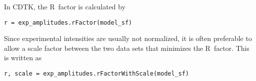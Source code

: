 \documentclass[12pt]{article}
\begin{document}
\begin{sloppy}
In CDTK, the R~factor is calculated by
\begin{verbatim}
r = exp_amplitudes.rFactor(model_sf)
\end{verbatim}
Since experimental intensities are usually not normalized, it is often
preferable to allow a scale factor between the two data sets that
minimizes the R~factor. This is written as
\begin{verbatim}
r, scale = exp_amplitudes.rFactorWithScale(model_sf)
\end{verbatim}


\end{sloppy}
\end{document}
